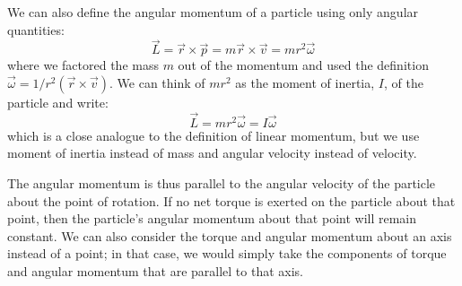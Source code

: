 We can also define the angular momentum of a particle using only angular quantities:
\begin{equation}
\vec L = \vec r \times \vec p =  m \vec r \times \vec v = mr^2 \vec\omega
\end{equation}
where we factored the mass $m$ out of the momentum and used the definition $\vec \omega = 1/r^2(\vec r \times \vec v)$. We can think of $mr^2$ as the moment of inertia, $I$, of the particle and write:
\begin{equation}
\label{eq:angularmomentumrolling:liw}
\boxed{\vec L  = mr^2 \vec\omega = I \vec\omega}
\end{equation}
which is a close analogue to the definition of linear momentum, but we use moment of inertia instead of mass and angular velocity instead of velocity.

The angular momentum is thus parallel to the angular velocity of the particle about the point of rotation. If no net torque is exerted on the particle about that point, then the particle's angular momentum about that point will remain constant. We can also consider the torque and angular momentum about an axis instead of a point; in that case, we would simply take the components of torque and angular momentum that are parallel to that axis.

